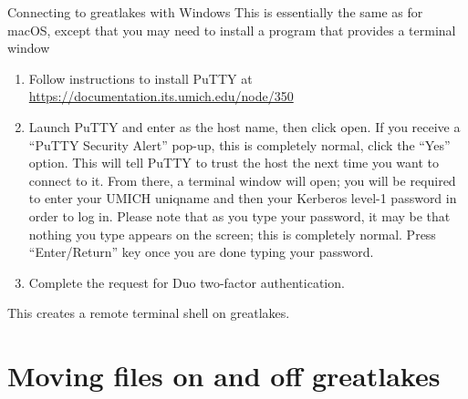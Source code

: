 \begin{frame}{Connecting to greatlakes with Windows}
This is essentially the same as for macOS, except that you may need to install a program that provides a terminal window
  \begin{enumerate}
  \item Follow instructions to install PuTTY at \url{https://documentation.its.umich.edu/node/350}
  \item Launch PuTTY and enter  as the host name, then click open.
If you receive a ``PuTTY Security Alert'' pop-up, this is completely normal, click the ``Yes'' option. This will tell PuTTY to trust the host the next time you want to connect to it. From there, a terminal window will open; you will be required to enter your UMICH uniqname and then your Kerberos level-1 password in order to log in. Please note that as you type your password, it may be that nothing you type appears on the screen; this is completely normal. Press ``Enter/Return'' key once you are done typing your password.
\item Complete the request for Duo two-factor authentication.
  \end{enumerate}
This creates a remote terminal shell on greatlakes.

\end{frame}


\section{Moving files on and off greatlakes}

